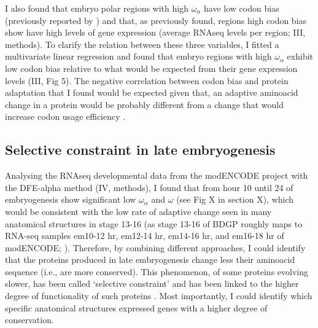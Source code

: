 I also found that embryo polar regions with high $\omega_{\alpha}$ have low codon bias (previously reported by  \citealp{Sharp1991,Betancourt2002,Haerty2007}) and that, as \citet{Plotkin2011} previously found, regions high codon bias show have high levels of gene expression (average RNAseq levels per region; III, methods).
To clarify the relation between these three variables, I fitted a multivariate linear regression and found that embryo regions with high $\omega_{\alpha}$ exhibit low codon bias relative to what would be expected from their gene expression levels (III, Fig 5).
The negative correlation between codon bias and protein adaptation that I found would be expected given that, an adaptive  aminoacid change in a protein would be probably different from a change that would increase codon usage efficiency \citep{Hershberg2008,Presnyak2015}.

\subsection{Selective constraint in late embryogenesis}

Analysing the RNAseq developmental data from the modENCODE project \citep{Graveley2011} with the DFE-alpha method (IV, methods), I found that from hour 10 until 24 of embryogenesis show significant low $\omega_{\alpha}$ and $\omega$ (see Fig X in section X), which would be consistent with the low rate of adaptive change seen in many anatomical structures in stage 13-16 (as stage 13-16 of BDGP roughly maps to RNA-seq samples em10-12 hr, em12-14 hr, em14-16 hr, and em16-18 hr of modENCODE; \citealp{Hammonds2013}).
Therefore, by combining different approaches, I could identify that the proteins produced in late embryogenesis change less their aminoacid sequence (i.e., are more conserved). This phenomenon, of some proteins evolving slower, has been called `selective constraint' and has been linked to the higher degree of functionality of such proteins \citep{kimura1983neutral}.
Most importantly, I could identify which specific anatomical structures expressed genes with a higher degree of conservation.